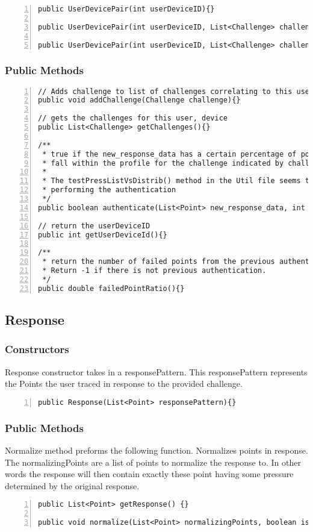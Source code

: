 \documentclass{article} %
\begin{document}
\begin{lstlisting}[numbers=left]
public UserDevicePair(int userDeviceID){}

public UserDevicePair(int userDeviceID, List<Challenge> challenges){}

public UserDevicePair(int userDeviceID, List<Challenge> challenges, double allowed_deviations, double authentication_threshold){}
\end{lstlisting}

\subsubsection{Public Methods}
\begin{lstlisting}[numbers=left]
// Adds challenge to list of challenges correlating to this user/device pair
public void addChallenge(Challenge challenge){}

// gets the challenges for this user, device
public List<Challenge> getChallenges(){}

/**
 * true if the new_response_data has a certain percentage of points which
 * fall within the profile for the challenge indicated by challenge_id
 * 
 * The testPressListVsDistrib() method in the Util file seems to be
 * performing the authentication
 */
public boolean authenticate(List<Point> new_response_data, int challenge_id){}

// return the userDeviceID
public int getUserDeviceId(){}

/**
 * return the number of failed points from the previous authentication.
 * Return -1 if there is not previous authentication.
 */
public double failedPointRatio(){}
\end{lstlisting}

\subsection{Response}
\subsubsection{Constructors}
Response constructor takes in a responsePattern. This responsePattern represents the Points the user traced in response to the provided challenge.
\begin{lstlisting}[numbers=left]
public Response(List<Point> responsePattern){}
\end{lstlisting}

\subsubsection{Public Methods}
Normalize method preforms the following function. Normalizes points in response. The normalizingPoints are a list of points to normalize the response to. In other words the response will then contain exactly these point having some pressure determined by the original response.
\begin{lstlisting}[numbers=left]
public List<Point> getResponse() {}

public void normalize(List<Point> normalizingPoints, boolean isChallengeHorizontal) {}
\end{lstlisting}
\end{document}
